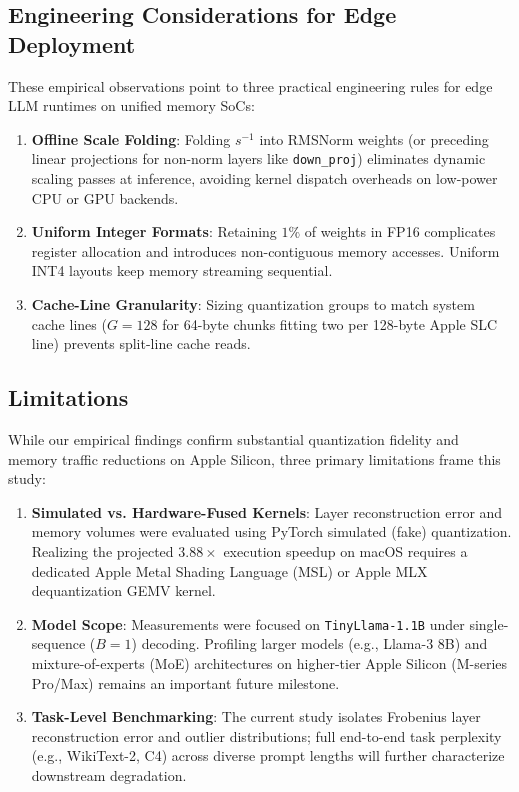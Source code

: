 \documentclass[runningheads,oribibl]{llncs}
\begin{document}
\subsection{Engineering Considerations for Edge Deployment}
These empirical observations point to three practical engineering rules for edge LLM runtimes on unified memory SoCs:
\begin{enumerate}
    \item \textbf{Offline Scale Folding}: Folding $s^{-1}$ into RMSNorm weights (or preceding linear projections for non-norm layers like \texttt{down\_proj}) eliminates dynamic scaling passes at inference, avoiding kernel dispatch overheads on low-power CPU or GPU backends.
    \item \textbf{Uniform Integer Formats}: Retaining $1\%$ of weights in FP16 complicates register allocation and introduces non-contiguous memory accesses. Uniform INT4 layouts keep memory streaming sequential.
    \item \textbf{Cache-Line Granularity}: Sizing quantization groups to match system cache lines ($G=128$ for 64-byte chunks fitting two per 128-byte Apple SLC line) prevents split-line cache reads.
\end{enumerate}

\subsection{Limitations}
While our empirical findings confirm substantial quantization fidelity and memory traffic reductions on Apple Silicon, three primary limitations frame this study:
\begin{enumerate}
    \item \textbf{Simulated vs. Hardware-Fused Kernels}: Layer reconstruction error and memory volumes were evaluated using PyTorch simulated (fake) quantization. Realizing the projected $3.88\times$ execution speedup on macOS requires a dedicated Apple Metal Shading Language (MSL) or Apple MLX dequantization GEMV kernel.
    \item \textbf{Model Scope}: Measurements were focused on \texttt{TinyLlama-1.1B} under single-sequence ($B=1$) decoding. Profiling larger models (e.g., Llama-3 8B) and mixture-of-experts (MoE) architectures on higher-tier Apple Silicon (M-series Pro/Max) remains an important future milestone.
    \item \textbf{Task-Level Benchmarking}: The current study isolates Frobenius layer reconstruction error and outlier distributions; full end-to-end task perplexity (e.g., WikiText-2, C4) across diverse prompt lengths will further characterize downstream degradation.
\end{enumerate}
\end{document}
